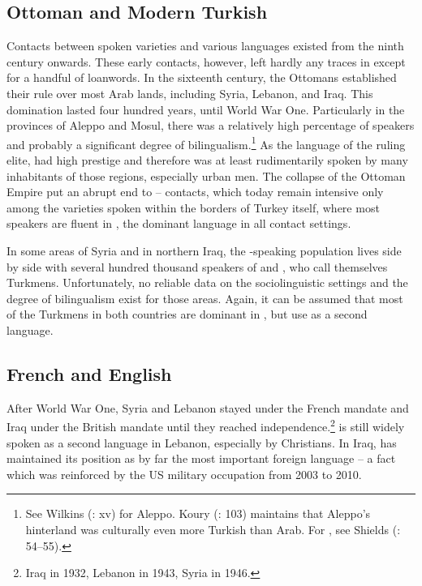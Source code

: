 \documentclass[output=paper]{langsci/langscibook}
\begin{document}
 \subsection{Ottoman and Modern Turkish} 
Contacts between spoken  varieties and various  languages existed from the ninth century onwards. These early contacts, however, left hardly any traces in  except for a handful of {loanwords}. In the sixteenth century, the Ottomans established their rule over most Arab lands, including Syria, Lebanon, and Iraq. This domination lasted four hundred years, until World War One. Particularly in the provinces of Aleppo and {Mosul}, there was a relatively high percentage of  speakers and probably a significant degree of {bilingualism}.\footnote{See Wilkins (\citeyear{Wilkins2010}: xv) for Aleppo. Koury (\citeyear{Khoury1987}: 103) maintains that Aleppo’s hinterland was culturally even more Turkish than Arab. For , see Shields (\citeyear{Shields2004}: 54--55).} As the language of the ruling elite,  had high {prestige} and therefore was at least rudimentarily spoken by many inhabitants of those regions, especially urban men. The collapse of the Ottoman Empire put an abrupt end to -- contacts, which today remain {intensive} only among the  varieties spoken within the borders of Turkey itself, where most  speakers are fluent in , the dominant language in all contact settings.

In some areas of Syria and in northern Iraq, the -speaking population lives side by side with several hundred thousand speakers of  and  , who call themselves Turkmens. Unfortunately, no reliable data on the sociolinguistic settings and the degree of {bilingualism} exist for those areas. Again, it can be assumed that most of the Turkmens in both countries are dominant in , but use  as a second language.

 \subsection{French and English} \label{french}

After World War One, Syria and Lebanon stayed under the French mandate and Iraq under the British mandate until they reached independence.\footnote{Iraq in 1932, Lebanon in 1943, Syria in 1946.}  is still widely spoken as a second language in Lebanon, especially by {Christians}. In Iraq,  has maintained its position as by far the most important foreign language – a fact which was reinforced by the US military occupation from 2003 to 2010. 
\end{document}
